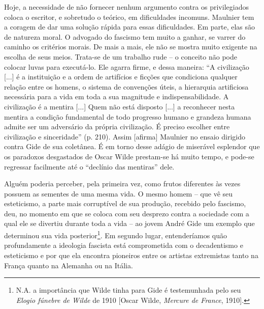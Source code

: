 Hoje, a necessidade de não fornecer nenhum argumento contra os
privilegiados coloca o escritor, e sobretudo o teórico, em dificuldades
incomuns. Maulnier tem a coragem de dar uma solução rápida para essas
dificuldades. Em parte, elas são de natureza moral. O advogado do
fascismo tem muito a ganhar, se varrer do caminho os critérios morais.
De mais a mais, ele não se mostra muito exigente na escolha de seus
meios. Trata-se de um trabalho rude -- o conceito não pode colocar luvas
para executá-lo. Ele agarra firme, e dessa maneira: ``A civilização
{[}...{]} é a instituição e a ordem de artifícios e ficções que
condiciona qualquer relação entre os homens, o sistema de convenções
úteis, a hierarquia artificiosa necessária para a vida em toda a sua
magnitude e indispensabilidade. A civilização é a mentira {[}...{]} Quem
não está disposto {[}...{]} a reconhecer nesta mentira a condição
fundamental de todo progresso humano e grandeza humana admite ser um
adversário da própria civilização. É preciso escolher entre civilização
e sinceridade'' (p. 210). Assim {[}afirma{]} Maulnier no ensaio dirigido
contra Gide de sua coletânea. É em torno desse adágio de miserável
esplendor que os paradoxos desgastados de Oscar Wilde prestam-se há
muito tempo, e pode-se regressar facilmente até o ``declínio das
mentiras'' dele.

Alguém poderia perceber, pela primeira vez, como frutos diferentes às
vezes possuem as sementes de uma mesma vida. O mesmo homem -- que vê seu
esteticismo, a parte mais corruptível de sua produção, recebido pelo
fascismo, deu, no momento em que se coloca com seu desprezo contra a
sociedade com a qual ele se divertiu durante toda a vida -- ao jovem
André Gide um exemplo que determinou sua vida posterior\footnote{N.A. a
  importância que Wilde tinha para Gide é testemunhada pelo seu
  \emph{Elogio fúnebre de Wilde} de 1910 {[}Oscar Wilde, \emph{Mercure
  de France}, 1910{]}.}. Em segundo lugar, entenderíamos quão
profundamente a ideologia fascista está comprometida com o decadentismo
e esteticismo e por que ela encontra pioneiros entre os artistas
extremistas tanto na França quanto na Alemanha ou na Itália.

